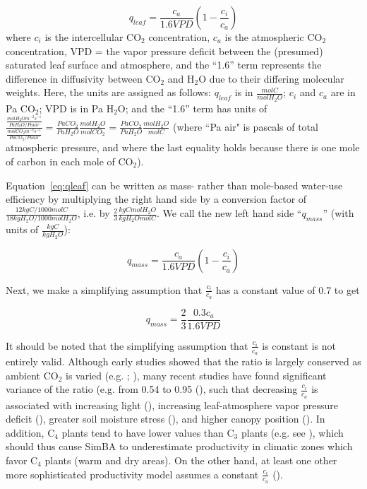 \begin{equation}
\label{eq:qleaf}
q_{leaf} = \frac{c_{a}}{1.6VPD}(1-\frac{c_{i}}{c_{a}})
\end{equation}
where ${c_{i}}$ is the intercellular CO$_2$ concentration, ${c_{a}}$ is the atmospheric CO$_2$ concentration, VPD = the vapor pressure deficit between the (presumed) saturated leaf surface and atmosphere, and the ``1.6'' term represents the difference in diffusivity between CO$_{2}$ and H$_{2}$O due to their differing molecular weights.  Here,  the units are assigned as follows: $q_{leaf}$ is in $\frac{mol C}{mol H_{2}O}$; ${c_{i}}$ and ${c_{a}}$ are in Pa CO$_2$; VPD is in Pa H$_2$O; and the ``1.6'' term has units of $\frac{\frac{mol H_{2}O m^{-2} s^{-1}}{Pa H_{2}O/Pa air}}{\frac{mol CO_{2} m^{-2} s^{-1}}{Pa CO_{2}/Pa air}} = \frac{Pa CO_2}{Pa H_{2}O} \frac{mol H_{2}O}{mol CO_2} = \frac{Pa CO_2}{Pa H_{2}O} \frac{mol H_{2}O}{mol C}$ (where ``Pa air" is pascals of total atmospheric pressure, and where the last equality holds because there is one mole of carbon in each mole of CO$_2$).

Equation~\eqref{eq:qleaf} can be written as mass- rather than mole-based water-use efficiency by multiplying the right hand side by a conversion factor of $\frac{12 kg C / 1000 mol C}{18 kg H_2O / 1000 mol H_2O}$, i.e. by $\frac{2}{3} \frac{kg C mol H_2O}{kg H_2O mol C}$.  We call the new left hand side ``$q_{mass}$'' (with units of $\frac{kg C}{kg H_2O}$):

\begin{equation}
\label{eq:qmass}
q_{mass} = \frac{c_{a}}{1.6VPD}(1-\frac{c_{i}}{c_{a}})
\end{equation}

Next, we make a simplifying assumption that $\frac{c_i}{c_a}$ has a constant value of 0.7 to get

\begin{equation}
\label{eq:qmass2}
q_{mass} = \frac{2}{3}\frac{0.3 c_{a}}{1.6VPD}
\end{equation}

It should be noted that the simplifying  assumption that
$\frac{c_i}{c_a}$ is constant is not entirely valid.
Although early studies showed that the ratio is largely conserved
as ambient CO$_2$ is varied (e.g. \cite{wong1979}; \cite{polley1993}),
many recent studies have found significant variance of the ratio
(e.g. from 0.54 to 0.95 (\cite{brooks1997}), such that decreasing
$\frac{c_i}{c_a}$ is associated with increasing light (\cite{brooks1997}),
increasing leaf-atmosphere vapor pressure deficit (\cite{morison1983}),
greater soil moisture stress (\cite{turnbull2002}), and higher canopy
position (\cite{brooks1997}).  In addition, C$_4$ plants tend to have
lower values than C$_3$ plants (e.g. see \cite{bunce2005}), which should
thus cause SimBA to underestimate productivity in climatic zones which
favor C$_4$ plants (warm and dry areas).  On the other hand, at least
one other more sophisticated productivity model assumes a constant
$\frac{c_i}{c_a}$ (\cite{knorr2000}). 

